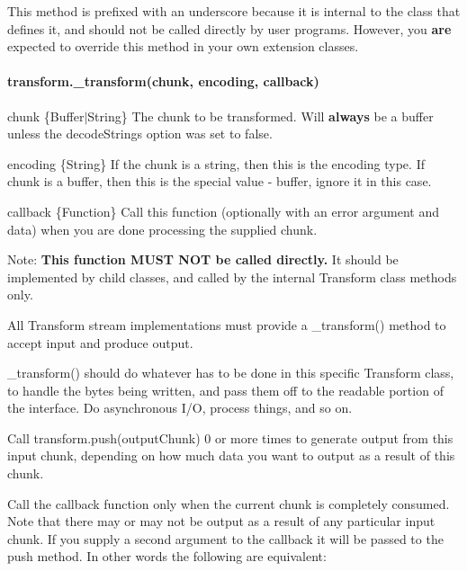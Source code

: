 This method is prefixed with an underscore because it is internal to the class that defines it, and should not be called directly by user programs. However, you {\bfseries are} expected to override this method in your own extension classes.

\paragraph*{transform.\+\_\+transform(chunk, encoding, callback)}


\begin{DoxyItemize}
\item {\ttfamily chunk} \{Buffer$\vert$\+String\} The chunk to be transformed. Will {\bfseries always} be a buffer unless the {\ttfamily decode\+Strings} option was set to {\ttfamily false}.
\item {\ttfamily encoding} \{String\} If the chunk is a string, then this is the encoding type. If chunk is a buffer, then this is the special value -\/ \textquotesingle{}buffer\textquotesingle{}, ignore it in this case.
\item {\ttfamily callback} \{Function\} Call this function (optionally with an error argument and data) when you are done processing the supplied chunk.
\end{DoxyItemize}

Note\+: {\bfseries This function M\+U\+ST N\+OT be called directly.} It should be implemented by child classes, and called by the internal Transform class methods only.

All Transform stream implementations must provide a {\ttfamily \+\_\+transform()} method to accept input and produce output.

{\ttfamily \+\_\+transform()} should do whatever has to be done in this specific Transform class, to handle the bytes being written, and pass them off to the readable portion of the interface. Do asynchronous I/O, process things, and so on.

Call {\ttfamily transform.\+push(output\+Chunk)} 0 or more times to generate output from this input chunk, depending on how much data you want to output as a result of this chunk.

Call the callback function only when the current chunk is completely consumed. Note that there may or may not be output as a result of any particular input chunk. If you supply a second argument to the callback it will be passed to the push method. In other words the following are equivalent\+:


